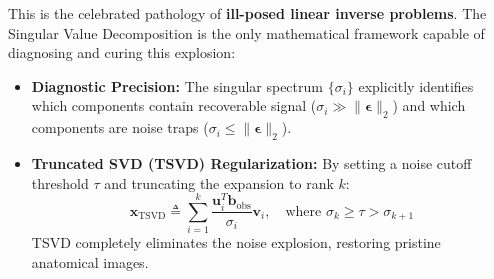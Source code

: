 This is the celebrated pathology of \textbf{ill-posed linear inverse problems}. The Singular Value Decomposition is the only mathematical framework capable of diagnosing and curing this explosion:
\begin{itemize}
    \item \textbf{Diagnostic Precision:} The singular spectrum $\{\sigma_i\}$ explicitly identifies which components contain recoverable signal ($\sigma_i \gg \|\boldsymbol{\epsilon}\|_2$) and which components are noise traps ($\sigma_i \le \|\boldsymbol{\epsilon}\|_2$).
    \item \textbf{Truncated SVD (TSVD) Regularization:} By setting a noise cutoff threshold $\tau$ and truncating the expansion to rank $k$:
    \begin{equation}
    \mathbf{x}_{\text{TSVD}} \triangleq \sum_{i=1}^k \frac{\mathbf{u}_i^T \mathbf{b}_{\text{obs}}}{\sigma_i} \mathbf{v}_i, \quad \text{where } \sigma_k \ge \tau > \sigma_{k+1}
    \end{equation}
    TSVD completely eliminates the noise explosion, restoring pristine anatomical images.
\end{itemize}

